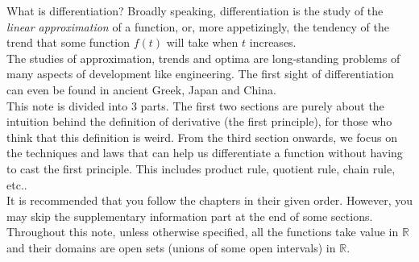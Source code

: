 What is differentiation?
Broadly speaking, differentiation is the study of the \textit{linear approximation} of a function, or, more appetizingly, the tendency of the trend that some function $f(t)$ will take when $t$ increases.\\
The studies of approximation, trends and optima are long-standing problems of many aspects of development like engineering.
The first sight of differentiation can even be found in ancient Greek, Japan and China.\\
This note is divided into 3 parts.
The first two sections are purely about the intuition behind the definition of derivative (the first principle), for those who think that this definition is weird.
From the third section onwards, we focus on the techniques and laws that can help us differentiate a function without having to cast the first principle.
This includes product rule, quotient rule, chain rule, etc..\\
It is recommended that you follow the chapters in their given order.
\ifcompilesupp
However, you may skip the supplementary information part at the end of some sections.
\fi
\\
Throughout this note, unless otherwise specified, all the functions take value in $\mathbb R$ and their domains are open sets (unions of some open intervals) in $\mathbb R$.